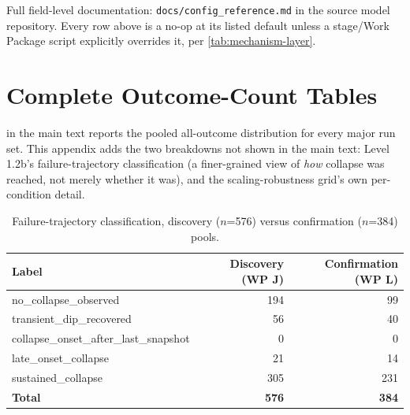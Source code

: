 \begin{table}[htbp]
\centering
\caption{Selected configuration parameters relevant to Level 1.2/1.2b
results (full reference: source repository \texttt{docs/config\_%
reference.md}).}
\label{tab:parameters}


\medskip
\noindent\footnotesize Full field-level documentation:
\texttt{docs/config\_reference.md} in the source model repository. Every
row above is a no-op at its listed default unless a stage/Work Package
script explicitly overrides it, per \cref{tab:mechanism-layer}.
\normalsize
\end{table}

\clearpage
\section{Complete Outcome-Count Tables}
\label{sec:appendix-outcomes}

 in the main text reports the pooled
all-outcome distribution for every major run set. This appendix adds the
two breakdowns not shown in the main text: Level 1.2b's failure-trajectory
classification (a finer-grained view of \textit{how} collapse was reached,
not merely whether it was), and the scaling-robustness grid's own
per-condition detail.

\begin{table}[htbp]
\centering
\caption{Failure-trajectory classification, discovery ($n$=576) versus
confirmation ($n$=384) pools.}
\label{tab:failure-trajectory}
\begin{tabular}{@{}lrr@{}}
\toprule
\textbf{Label} & \textbf{Discovery (WP J)} & \textbf{Confirmation (WP L)} \\
\midrule
no\_collapse\_observed              & 194 & 99 \\
transient\_dip\_recovered           & 56  & 40 \\
collapse\_onset\_after\_last\_snapshot & 0 & 0 \\
late\_onset\_collapse               & 21  & 14 \\
sustained\_collapse                 & 305 & 231 \\
\midrule
\textbf{Total} & \textbf{576} & \textbf{384} \\
\bottomrule
\end{tabular}
\end{table}

